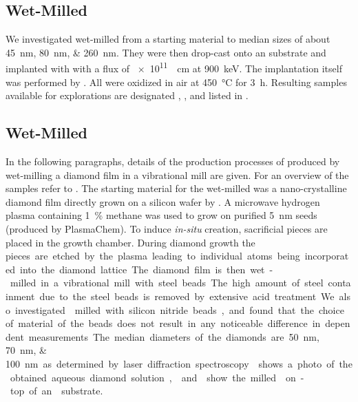 	\subsection{Wet-Milled \HPHT \Nds}\label{subsec::milled_hpht_nds}
		We investigated \nds wet-milled from a \HPHT starting material to median sizes of about \SIlist{45;80;260}{nm}.
		They were then drop-cast onto an \ir substrate and implanted with  with a flux of \SI{e11}{\per\centi\meter} at \SI{900}{\kilo\electronvolt}. The implantation itself was performed by \rogalla.
		All \HPHT \nds were oxidized in air at \SI{450}{\celsius} for \SI{3}{\hour}. Resulting samples available for explorations are designated \hphtimpfortyfive, \hphtimpeighty, \hphtimptwosixty and listed in .

	\subsection{Wet-Milled \CVD \Nds}\label{subsec::milled_nds}

		In the following paragraphs, details of the production processes of \nd produced by wet-milling a \CVD diamond film in a vibrational mill are given.
		For an overview of the samples refer to .
		The starting material for the wet-milled \nds was a nano-crystalline diamond film \cite{Williams2006a} directly grown on a silicon wafer by \CVD.
		A microwave hydrogen plasma containing \SI{1}{\percent} methane was used to grow on purified \SI{5}{\nano\meter} \nd seeds (produced by PlasmaChem).
		To induce \textit{in-situ} \siv creation, sacrificial \Si pieces are placed in the growth chamber.
		During diamond growth the \si pieces are etched by the plasma leading to individual atoms being incorporated into the diamond lattice.
		The diamond film is then wet-milled in a vibrational mill with steel beads.
		The high amount of steel containment due to the steel beads is removed by extensive acid treatment.
		We also investigated \nds milled with silicon nitride beads, and found that the choice of material of the beads does not result in any noticeable difference in dependent measurements.
		The median diameters of the diamonds are \SIlist{50; 70; 100}{\nano\meter} as determined by laser diffraction spectroscopy. 
		 shows a photo of the obtained aqueous diamond solution,  and  show the milled \nds on-top of an \ir substrate.


